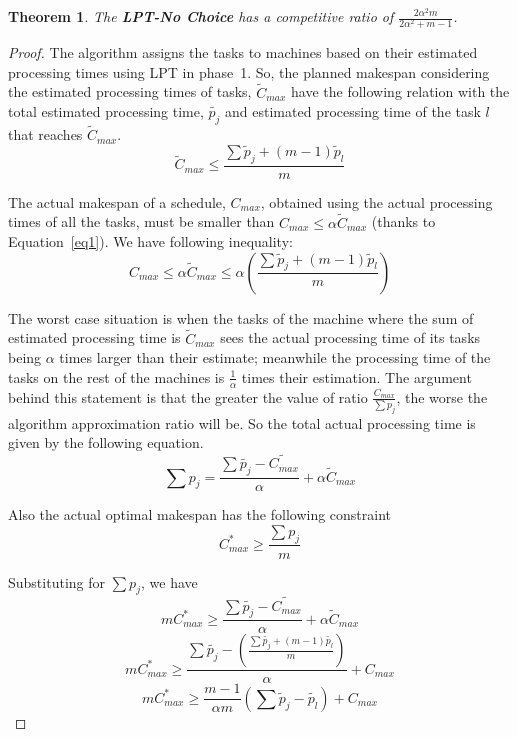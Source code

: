 \documentclass[10pt, conference, compsocconf]{IEEEtran}
\newtheorem{theorem}{Theorem}
\begin{document}
\begin{theorem}
\label{th:strat1-ub}
The \textbf{LPT-No Choice} has a competitive ratio of $ \frac{2\alpha^{2}m}{2\alpha^{2}+ m-1}$.
\end{theorem} 

\begin{proof}
  The algorithm assigns the tasks to machines based on their
  estimated processing times using LPT in phase~1. So, the
  planned makespan considering the estimated processing times of tasks,
  $\tilde{C}_{max}$ have the following relation with the total
  estimated processing time, $\tilde{p_j}$ and estimated processing
  time of the task  $l$ that reaches $\tilde{C}_{max}$.
\begin{equation}\label{eq2}
\tilde C_{max}\leq  \frac{\sum{\tilde p_j + (m-1) \tilde p_l} }{m}
\end{equation}

The actual makespan of a schedule, $C_{max}$, obtained using the
actual processing times of all the tasks, must be smaller than $C_{max} \leq \alpha
\tilde C_{max}$ (thanks to Equation~\ref{eq1}). We
have following inequality:
\begin{equation}\label{eq3}
  C_{max}\leq \alpha \tilde C_{max}\leq \alpha \left ( \frac{\sum{\tilde p_j + (m-1) \tilde p_l} }{m} \right )
\end{equation} 

The worst case situation is when the tasks of the machine where the
sum of estimated processing time is $\tilde C_{max}$ sees the actual
processing time of its tasks being $\alpha$ times larger than their
estimate; meanwhile the processing time of the tasks on the rest of the
machines is $\frac{1}{\alpha}$ times their estimation. The argument
behind this statement is that the greater the value of ratio
$\frac{C_{max}}{\sum{p_j}}$, the worse the algorithm approximation
ratio will be. So the total actual processing time is
given by the following equation.
 \begin{equation}\label{eq4}
 \sum {p_j} = \frac{\sum \tilde{p_j}- \tilde{C_{max}}}{\alpha} + \alpha \tilde C_{max}
 \end{equation}
 
 Also the actual optimal makespan has the following constraint
 \begin{equation}\nonumber 
C_{max}^{*}\geq \frac{\sum {p_j}}{m}
\end{equation}

Substituting for  $ \sum {p_j}$, we have
 \begin{equation}\nonumber 
 m C_{max}^{*}\geq \frac{\sum \tilde{p_j}- \tilde{C_{max}}}{\alpha} + \alpha \tilde C_{max}
 \end{equation} 
\begin{equation}\nonumber 
 m C_{max}^{*}\geq \frac{\sum \tilde{p_j} - \left( \frac{\sum{\tilde{p_j} + (m-1) \tilde{p_l} }}{m} \right )} {\alpha} + {C_{max}}
\end{equation}
\begin{equation}\nonumber
 m C_{max}^{*}\geq \frac{m-1}{\alpha m} \left( \sum \tilde p_j - \tilde{p_l} \right) + {C_{max}}
 \end{equation}


\end{proof}
\end{document}
